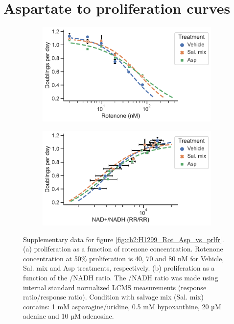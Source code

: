 \section{Aspartate to proliferation curves}
\label{sec:ch2:app:asp_prlfr}
\begin{figure}[ht]
     \centering
     \begin{subfigure}[b]{0.49\textwidth}
         \includegraphics[width=\textwidth]{figures/chap2/app/H1299_Rot_Rot_vs_prlfr_noPyr.pdf}
         \caption{}
         \label{fig:app_ch2:H1299_Rot_Rot_vs_prlfr}
     \end{subfigure}
     \hfill
     \begin{subfigure}[b]{0.49\textwidth}
         \includegraphics[width=\textwidth]{figures/chap2/app/H1299_Rot_NAD_vs_prlfr_noPyr.pdf}
         \caption{}
         \label{fig:app_ch2:H1299_Rot_NAD_vs_prlfr}
     \end{subfigure}
        \caption[H1299 rotenone titration aspartate to proliferation.]{
        Supplementary data for figure \ref{fig:ch2:H1299_Rot_Asp_vs_prlfr}.
        (a) proliferation as a function of rotenone concentration.
        Rotenone concentration at 50\% proliferation is 40, 70 and 80 nM for Vehicle, Sal. mix and Asp treatments, respectively.
        (b) proliferation as a function of the \NAD{}/NADH ratio.
        The \NAD{}/NADH ratio was made using internal standard normalized LCMS measurements (response ratio/response ratio).
        Condition with salvage mix (Sal. mix) contains: 1 mM asparagine/uridine, 0.5 mM hypoxanthine, 20 µM adenine and 10 µM adenosine.
        }
        \label{fig:app_ch2:H1299_Rot_RotNAD_vs_prlfr}
\end{figure}


